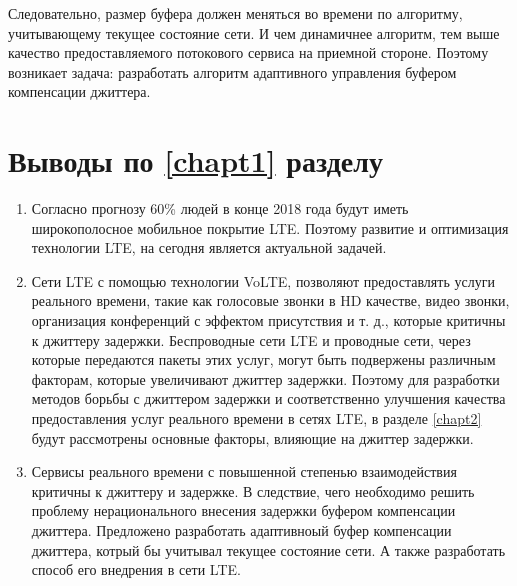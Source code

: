 Следовательно, размер буфера должен меняться во времени по алгоритму, учитывающему текущее состояние сети. 
И чем динамичнее алгоритм, тем выше качество предоставляемого потокового сервиса на приемной стороне. 
Поэтому возникает задача: разработать алгоритм адаптивного управления буфером компенсации джиттера.









\clearpage
\section{Выводы по \ref{chapt1} разделу } \label{sect_conclus1}

\begin{enumerate}
\item Согласно прогнозу \cite{ericsson} 60\% людей в конце 2018 года будут иметь широкополосное мобильное покрытие LTE. Поэтому развитие и оптимизация технологии LTE, на сегодня является актуальной задачей.

\item Сети LTE с помощью технологии VoLTE, позволяют предоставлять услуги реального времени, такие как голосовые звонки в HD качестве, видео звонки, организация конференций с эффектом присутствия и т. д., которые критичны к джиттеру задержки. Беспроводные сети LTE и проводные сети, через которые передаются пакеты этих услуг, могут быть подвержены различным факторам, которые увеличивают джиттер задержки. Поэтому для разработки методов борьбы с джиттером задержки и соответственно улучшения качества предоставления услуг реального времени в сетях LTE, в разделе \ref{chapt2} будут рассмотрены основные факторы, влияющие на джиттер задержки.

\item Сервисы реального времени с повышенной степенью взаимодействия критичны к джиттеру и задержке. В следствие, чего необходимо решить проблему нерационального внесения задержки буфером компенсации джиттера. 
Предложено разработать адаптивноый буфер компенсации джиттера, котрый бы учитывал текущее состояние сети. 
А также разработать способ его внедрения  в сети LTE.

\end{enumerate}

\clearpage




